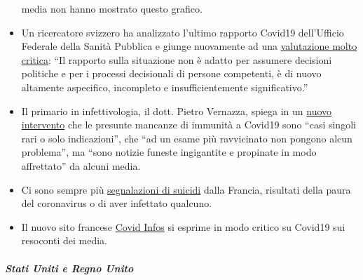 \begin{itemize}
  media non hanno mostrato questo grafico.
\item
  Un ricercatore svizzero ha analizzato l'ultimo rapporto Covid19
  dell'Ufficio Federale della Sanità Pubblica e giunge nuovamente ad una
  \href{https://covid-19-fakten.blogspot.com/2020/04/der-bag-situationsbericht-vom-1442020.html}{valutazione
  molto critica}: ``Il rapporto sulla situazione non è adatto per
  assumere decisioni politiche e per i processi decisionali di persone
  competenti, è di nuovo altamente aspecifico, incompleto e
  insufficientemente significativo.''
\item
  Il primario in infettivologia, il dott. Pietro Vernazza, spiega in un
  \href{https://infekt.ch/2020/04/hinterlaesst-coronavirus-eine-immunitaet/}{nuovo
  intervento} che le presunte mancanze di immunità a Covid19 sono ``casi
  singoli rari o solo indicazioni'', che ``ad un esame più ravvicinato
  non pongono alcun problema'', ma ``sono notizie funeste ingigantite e
  propinate in modo affrettato'' da alcuni media.
\item
  Ci sono sempre più
  \href{https://www.midilibre.fr/2020/04/09/coronavirus-ces-suicides-de-malades-ou-de-personnes-tenaillees-par-langoisse,8839373.php}{segnalazioni
  di suicidi} dalla Francia, risultati della paura del coronavirus o di
  aver infettato qualcuno.
\item
  Il nuovo sito francese \href{https://covidinfos.net/}{Covid Infos} si
  esprime in modo critico su Covid19 sui resoconti dei media.
\end{itemize}

\hypertarget{stati-uniti-e-regno-unito}{%
\subparagraph{\texorpdfstring{\textbf{Stati Uniti e Regno
Unito}}{Stati Uniti e Regno Unito}}\label{stati-uniti-e-regno-unito}}

